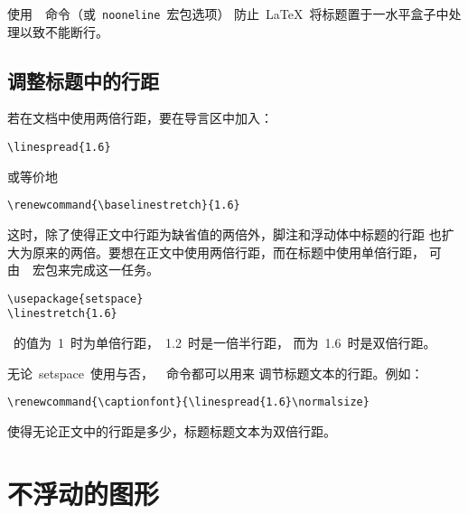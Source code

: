 使用~~命令（或~\texttt{nooneline}~宏包选项）
防止~\LaTeX{}~将标题置于一水平盒子中处理以致不能断行。

\clearpage

\subsection{调整标题中的行距}

若在文档中使用两倍行距，要在导言区中加入：
\begin{Verbatim}[xleftmargin=1cm]
\linespread{1.6}
\end{Verbatim}
或等价地
\begin{Verbatim}[xleftmargin=1cm]
\renewcommand{\baselinestretch}{1.6}
\end{Verbatim}
这时，除了使得正文中行距为缺省值的两倍外，脚注和浮动体中标题的行距
也扩大为原来的两倍。要想在正文中使用两倍行距，而在标题中使用单倍行距，
可由~~宏包来完成这一任务。
\begin{Verbatim}[xleftmargin=1cm]
\usepackage{setspace} 
\linestretch{1.6}
\end{Verbatim}
~的值为~1~时为单倍行距，~1.2~时是一倍半行距，
而为~1.6~时是双倍行距。

无论~\textsf{setspace}~使用与否，~~命令都可以用来
调节标题文本的行距。例如：
\begin{Verbatim}[xleftmargin=1cm]
\renewcommand{\captionfont}{\linespread{1.6}\normalsize}
\end{Verbatim}
使得无论正文中的行距是多少，标题标题文本为双倍行距。

\section{不浮动的图形}\label{sec:nonfloat}

